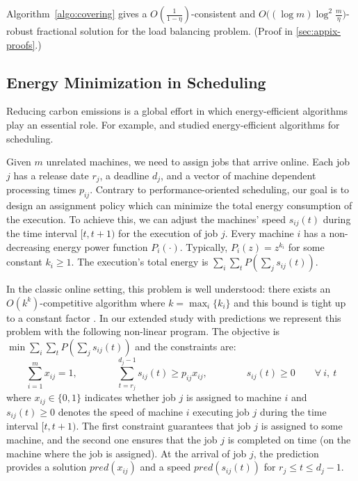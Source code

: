 \begin{proposition} \label{prop:load}
Algorithm~\ref{algo:covering} gives a
$O(\frac{1}{1 - \eta})$-consistent and $O\bigl((\log m) \log^{2} \frac{m}{\eta}\bigr)$-robust fractional solution
for the load balancing problem. (Proof in \cref{sec:appix-proofs}.)
\end{proposition}

\subsection{Energy Minimization in Scheduling}		\label{sec:energy}

Reducing carbon emissions is a global effort in which energy-efficient algorithms play an essential role. For example, \cite{Albers10:Energy-efficient-algorithms} and \cite{GuCaiZengZhangJinDai:2019} studied energy-efficient algorithms for scheduling.

Given $m$ unrelated machines, we need to assign jobs that arrive online. Each job $j$ has a release date $r_{j}$, a deadline $d_{j}$, and a vector of machine dependent processing times $p_{ij}$. Contrary to performance-oriented scheduling, our goal is to design an assignment policy which can minimize the total energy consumption of the execution. To achieve this, we can adjust the machines' speed $s_{ij}(t)$ during the time interval $[t,t+1)$ for the execution of job $j$. Every machine $i$ has a non-decreasing energy power function $P_{i}(\cdot)$. Typically, $P_{i}(z) = z^{k_{i}}$ for some constant $k_{i} \geq 1$. The execution's total energy is $\sum_{i} \sum_{t} P(\sum_{j} s_{ij}(t))$.

In the classic online setting, this problem is well understood: there exists an $O(k^{k})$-competitive algorithm \citep{Thang20:Online-Primal-Dual} where $k = \max_{i} \{k_{i}\}$
and this bound is tight up to a constant factor \citep{Caragiannis08:Better-bounds}. In our extended study with predictions we represent this problem with the following non-linear program. The objective is $\min \sum_{i} \sum_{t} P(\sum_{j} s_{ij}(t))$ and the constraints are:
$$
\sum_{i=1}^{m} x_{ij} = 1,  \qquad \qquad \sum_{t = r_{j}}^{d_{j}-1} s_{ij}(t) \geq p_{ij} x_{ij}, \qquad  \qquad s_{ij}(t) \geq 0  \qquad \forall\ i,\ t
$$
where $x_{ij} \in \{0,1\}$ indicates whether job $j$ is assigned to machine $i$
and $s_{ij}(t) \geq 0$ denotes the speed of machine $i$ executing job $j$ during the time interval $[t, t+1)$.
The first constraint guarantees that job $j$ is assigned to some machine, and the second one ensures
that the job $j$ is completed on time (on the machine where the job is assigned). At the arrival of
job $j$, the prediction provides a solution $pred(x_{ij})$ and a speed $pred(s_{ij}(t))$ for $r_{j} \leq t \leq d_{j} - 1$.

